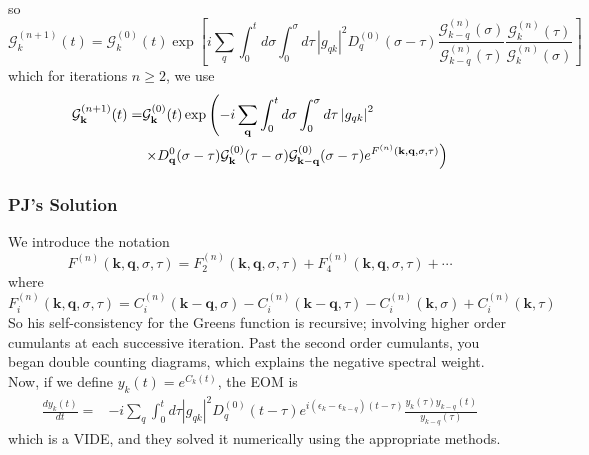 \begin{frame}
\begin{align}
\end{align}
so
\begin{equation}
    \mathcal{G}_k^{(n+1)}(t)
=\mathcal{G}_k^{(0)}(t)
\exp\!\left[
i\!\sum_q
\int_0^t d\sigma\!\!\int_0^\sigma d\tau\,
\left|g_{q k}\right|^2 D_q^{(0)}(\sigma\!-\!\tau)
\frac{\mathcal{G}_{k-q}^{(n)}(\sigma)}{\mathcal{G}_{k-q}^{(n)}(\tau)}
\frac{\mathcal{G}_k^{(n)}(\tau)}{\mathcal{G}_k^{(n)}(\sigma)}
\right]
\end{equation}
which for iterations $n \geq 2$, we use
\begin{align}
    \mathcal{G}_{\mathbf{k}}^{(n+1)}(t)= & \mathcal{G}_{\mathbf{k}}^{(0)}(t) \exp \left(-i \sum_{\mathbf{q}} \int_0^t d \sigma \int_0^\sigma d \tau\left|g_{q k}\right|^2\right. \\
& \left.\times D_{\mathbf{q}}^0(\sigma-\tau) \mathcal{G}_{\mathbf{k}}^{(0)}(\tau-\sigma) \mathcal{G}_{\mathbf{k}-\mathbf{q}}^{(0)}(\sigma-\tau) e^{F^{(n)}(\mathbf{k}, \mathbf{q}, \sigma, \tau)}\right) \notag
\end{align}

\end{frame}

\begin{frame}
    \frametitle{PJ's Solution}
We introduce the notation 
\begin{equation}
    F^{(n)}(\mathbf{k}, \mathbf{q}, \sigma, \tau) = F_2^{(n)}(\mathbf{k}, \mathbf{q}, \sigma, \tau)+F_4^{(n)}(\mathbf{k}, \mathbf{q}, \sigma, \tau)+\cdots
\end{equation}
where
\begin{equation}
    F_i^{(n)}(\mathbf{k}, \mathbf{q}, \sigma, \tau) = C_i^{(n)}(\mathbf{k}-\mathbf{q}, \sigma)-C_i^{(n)}(\mathbf{k}-\mathbf{q}, \tau) -C_i^{(n)}(\mathbf{k}, \sigma)+C_i^{(n)}(\mathbf{k}, \tau)
\end{equation}
So his self-consistency for the Greens function is recursive; involving higher order cumulants at each successive iteration. Past the second order cumulants, you began double counting diagrams, which explains the negative spectral weight.
Now, if we define $y_k(t)=e^{C_k(t)}$, the EOM is
\begin{align}
\frac{d y_k(t)}{d t}= & -i \sum_q \int_0^t d \tau\left|g_{q k}\right|^2 D_q^{(0)}(t-\tau) e^{i(\epsilon_k-\epsilon_{k-q})(t-\tau)} \frac{y_k(\tau) y_{k-q}(t)}{y_{k-q}(\tau)} \label{C1}
\end{align}
which is a VIDE, and they solved it numerically using the appropriate methods.

\end{frame}
